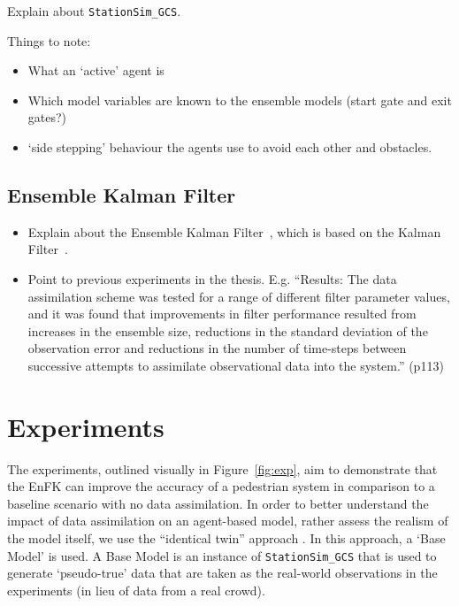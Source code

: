 \documentclass{article}
\begin{document}
Explain about \texttt{StationSim\_GCS}.

Things to note:
\begin{itemize}
  \item What an `active' agent is
  \item Which model variables are known to the ensemble models (start gate and exit gates?)  %
  \item `side stepping' behaviour the agents use to avoid each other and obstacles.
\end{itemize}

\subsection{Ensemble Kalman Filter}\label{sub:methods:enkf}

\begin{itemize}
    \item Explain about the Ensemble Kalman Filter~\citep{evensen_ensemble_2003},
        which is based on the Kalman Filter~\citep{kalman_new_1960}.
    \item Point to previous experiments in the thesis. E.g. ``Results: The data assimilation scheme was tested for a range of different filter
parameter values, and it was found that improvements in filter performance
resulted from increases in the ensemble size, reductions in the standard
deviation of the observation error and reductions in the number of time-steps
between successive attempts to assimilate observational data into the system.'' (p113)
\end{itemize}



\section{Experiments}\label{sec:exp}

The experiments, outlined visually in Figure~\ref{fig:exp}, aim to demonstrate that the EnFK can improve the accuracy of a pedestrian system in comparison to a baseline scenario with no data assimilation. In order to better understand the impact of data assimilation on an agent-based model, rather assess the realism of the model itself, we use the ``identical twin'' approach \citep{lueck_who_2019}. In this approach, a `Base Model' is used. A Base Model is an instance of \texttt{StationSim\_GCS} that is used to generate `pseudo-true' data that are taken as the real-world observations in the experiments (in lieu of data from a real crowd).
\end{document}

